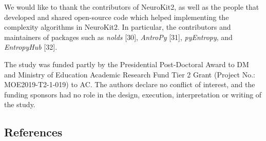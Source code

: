 \documentclass[
  man]{apa6}
\begin{document}
We would like to thank the contributors of NeuroKit2, as well as the people that developed and shared open-source code which helped implementing the complexity algorithms in NeuroKit2. In particular, the contributors and maintainers of packages such as \emph{nolds} {[}30{]}, \emph{AntroPy} {[}31{]}, \emph{pyEntropy}, and \emph{EntropyHub} {[}32{]}.

The study was funded partly by the Presidential Post-Doctoral Award to DM and Ministry of Education Academic Research Fund Tier 2 Grant (Project No.: MOE2019-T2-1-019) to AC. The authors declare no conflict of interest, and the funding sponsors had no role in the design, execution, interpretation or writing of the study.

\newpage

\hypertarget{references}{%
\subsection{References}\label{references}}
\end{document}
